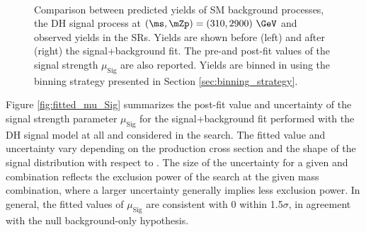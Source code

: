\begin{figure}[h]
\begin{subfigure}{0.45\textwidth}
  \end{subfigure} \\ \vspace{1em}
  \caption[]{Comparison between predicted yields of SM background processes, the DH signal process at \((\ms, \mZp) = (310, 2900)~\GeV\) and observed yields in the SRs. Yields are shown before (left) and after (right) the signal+background fit. The pre-and post-fit values of the signal strength \(\mu_\text{Sig}\) are also reported. Yields are binned in \minms using the binning strategy presented in Section \ref{sec:binning_strategy}.}
  \label{fig:before_after_SRs_MonoSlep_monoSWWsemilep_zp2900_dm200_dh310}
\end{figure}

Figure \ref{fig:fitted_mu_Sig} summarizes the post-fit value and uncertainty of the signal strength parameter \(\mu_\text{Sig}\) for the signal+background fit performed with the DH signal model at all \ms and \mZp considered in the search. The fitted value and uncertainty vary depending on the production cross section and the shape of the signal distribution with respect to \minms. The size of the uncertainty for a given \ms and \mZp combination reflects the exclusion power of the search at the given mass combination, where a larger uncertainty generally implies less exclusion power. In general, the fitted values of \(\mu_\text{Sig}\) are consistent with 0 within 1.5\(\sigma\), in agreement with the null background-only hypothesis.

